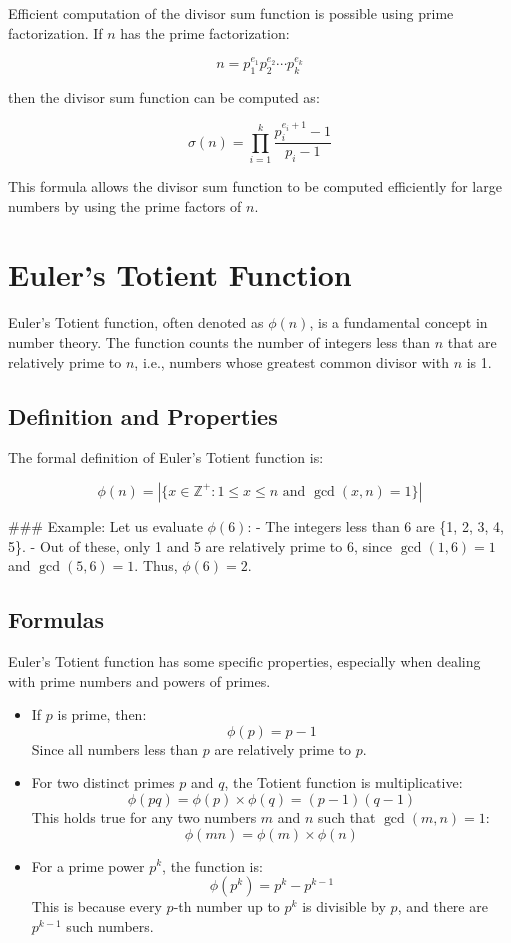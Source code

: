 \documentclass[10pt,a4paper]{article}
\begin{document}
Efficient computation of the divisor sum function is possible using prime factorization. If \(n\) has the prime factorization:

\[
n = p_1^{e_1} p_2^{e_2} \cdots p_k^{e_k}
\]

then the divisor sum function can be computed as:

\[
\sigma(n) = \prod_{i=1}^{k} \frac{p_i^{e_i + 1} - 1}{p_i - 1}
\]

This formula allows the divisor sum function to be computed efficiently for large numbers by using the prime factors of \(n\).



\section*{Euler’s Totient Function}

Euler’s Totient function, often denoted as \(\phi(n)\), is a fundamental concept in number theory. The function counts the number of integers less than \(n\) that are relatively prime to \(n\), i.e., numbers whose greatest common divisor with \(n\) is 1. 

\subsection*{Definition and Properties}

The formal definition of Euler’s Totient function is:

\[
\phi(n) = |\{x \in \mathbb{Z}^+ : 1 \leq x \leq n \text{ and } \gcd(x, n) = 1 \}|
\]

### Example: 
Let us evaluate \(\phi(6)\):
- The integers less than 6 are \{1, 2, 3, 4, 5\}.
- Out of these, only 1 and 5 are relatively prime to 6, since \(\gcd(1, 6) = 1\) and \(\gcd(5, 6) = 1\).
Thus, \(\phi(6) = 2\).

\subsection*{Formulas}

Euler's Totient function has some specific properties, especially when dealing with prime numbers and powers of primes.

\begin{itemize}
    \item If \(p\) is prime, then:
    \[
    \phi(p) = p - 1
    \]
    Since all numbers less than \(p\) are relatively prime to \(p\).

    \item For two distinct primes \(p\) and \(q\), the Totient function is multiplicative:
    \[
    \phi(pq) = \phi(p) \times \phi(q) = (p-1)(q-1)
    \]
    This holds true for any two numbers \(m\) and \(n\) such that \(\gcd(m, n) = 1\):
    \[
    \phi(mn) = \phi(m) \times \phi(n)
    \]
    \item For a prime power \(p^k\), the function is:
    \[
    \phi(p^k) = p^k - p^{k-1}
    \]
    This is because every \(p\)-th number up to \(p^k\) is divisible by \(p\), and there are \(p^{k-1}\) such numbers.
\end{itemize}
\end{document}
